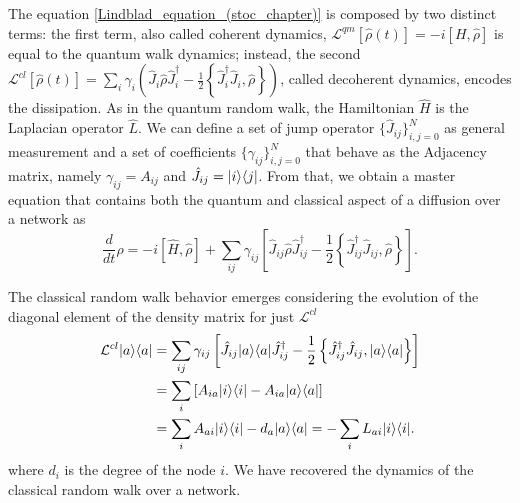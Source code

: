 The equation \eqref{Lindblad_equation_(stoc_chapter)} is composed by two distinct terms: the first term, also called coherent dynamics,
$\mathcal{L}^{qm}\left[\hat\rho(t)\right] = -i\left[H,\hat\rho\right]$ 
is equal to the quantum walk dynamics; instead, the second 
$\mathcal{L}^{cl}\left[\hat\rho(t)\right] = \sum_i \gamma_i \left(\hat J_i \hat\rho \hat J^\dagger_i - \frac{1}{2}\left\{ \hat J^\dagger_i\hat J_i, \hat\rho\right\} \right)$, 
called decoherent dynamics, encodes the dissipation. 
As in the quantum random walk, the Hamiltonian $\hat H$ is the Laplacian operator $\hat L$.
We can define a set of jump operator $\{\hat J_{ij} \}_{i,j=0}^{N}$ as general measurement and a set of coefficients $\{\gamma_{ij}\}_{i,j=0}^{N}$ that behave as the Adjacency matrix, namely $\gamma_{ij} =A_{ij}$ and $\hat J_{ij} = \lvert i\rangle\langle j\rvert$.
From that, we obtain a master equation that contains both the quantum and classical aspect of a diffusion over a network as
\begin{equation}\label{stochastic_lindblad_master}
    \frac{d}{dt}\hat \rho = -i\left[\hat H,\hat\rho\right] + \sum_{ij}\gamma_{ij}\left[\hat J_{ij} \hat\rho\hat J_{ij}^\dagger -\frac{1}{2} \left\{ \hat J_{ij}^\dagger \hat J_{ij}, \hat\rho\right\}\right].
\end{equation}

The classical random walk behavior emerges considering the evolution of the diagonal element of the density matrix for just $\mathcal{L}^{cl}$
\begin{equation}
    \begin{split}
        \mathcal{L}^{cl}\lvert a\rangle\langle a\rvert &= \sum_{ij}\gamma_{ij}\left[\hat J_{ij} \lvert a\rangle\langle a\rvert\hat J_{ij}^\dagger -\frac{1}{2} \left\{ \hat J_{ij}^\dagger \hat J_{ij}, \lvert a\rangle\langle a\rvert\right\}\right]\\
        &= \sum_{i}\left[A_{ia} \lvert i\rangle\langle i\rvert -A_{ia}\lvert a\rangle\langle a\rvert\right]\\
        &=\sum_{i} A_{ai} \lvert i\rangle\langle i\rvert - d_a \lvert a\rangle\langle a\rvert = -\sum_i L_{ai} \lvert i\rangle\langle i\rvert.
    \end{split}
\end{equation} 
where $d_i$ is the degree of the node $i$.
We have recovered the dynamics of the classical random walk over a network.

